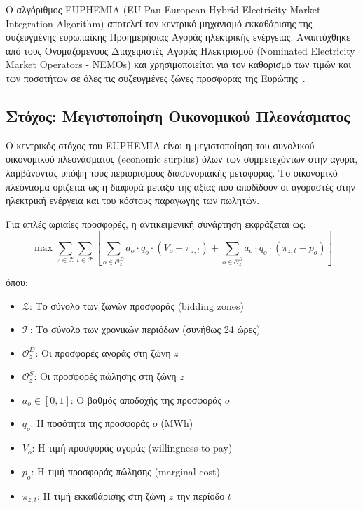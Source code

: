 Ο αλγόριθμος EUPHEMIA (EU Pan-European Hybrid Electricity Market Integration Algorithm) αποτελεί τον κεντρικό μηχανισμό εκκαθάρισης της συζευγμένης ευρωπαϊκής Προημερήσιας Αγοράς ηλεκτρικής ενέργειας. Αναπτύχθηκε από τους Ονομαζόμενους Διαχειριστές Αγοράς Ηλεκτρισμού (Nominated Electricity Market Operators - NEMOs) και χρησιμοποιείται για τον καθορισμό των τιμών και των ποσοτήτων σε όλες τις συζευγμένες ζώνες προσφοράς της Ευρώπης~\cite{euphemia-public-description}.

\subsection{Στόχος: Μεγιστοποίηση Οικονομικού Πλεονάσματος}
\label{subsec:euphemia-objective}

Ο κεντρικός στόχος του EUPHEMIA είναι η μεγιστοποίηση του συνολικού οικονομικού πλεονάσματος (economic surplus) όλων των συμμετεχόντων στην αγορά, λαμβάνοντας υπόψη τους περιορισμούς διασυνοριακής μεταφοράς. Το οικονομικό πλεόνασμα ορίζεται ως η διαφορά μεταξύ της αξίας που αποδίδουν οι αγοραστές στην ηλεκτρική ενέργεια και του κόστους παραγωγής των πωλητών.

Για απλές ωριαίες προσφορές, η αντικειμενική συνάρτηση εκφράζεται ως:
\begin{equation}
\label{eq:euphemia-objective}
\max \sum_{z \in \mathcal{Z}} \sum_{t \in \mathcal{T}} \left[ \sum_{o \in \mathcal{O}_z^D} a_o \cdot q_o \cdot (V_o - \pi_{z,t}) + \sum_{o \in \mathcal{O}_z^S} a_o \cdot q_o \cdot (\pi_{z,t} - p_o) \right]
\end{equation}

όπου:
\begin{itemize}
    \item $\mathcal{Z}$: Το σύνολο των ζωνών προσφοράς (bidding zones)
    \item $\mathcal{T}$: Το σύνολο των χρονικών περιόδων (συνήθως 24 ώρες)
    \item $\mathcal{O}_z^D$: Οι προσφορές αγοράς στη ζώνη $z$
    \item $\mathcal{O}_z^S$: Οι προσφορές πώλησης στη ζώνη $z$
    \item $a_o \in [0, 1]$: Ο βαθμός αποδοχής της προσφοράς $o$
    \item $q_o$: Η ποσότητα της προσφοράς $o$ (MWh)
    \item $V_o$: Η τιμή προσφοράς αγοράς (willingness to pay)
    \item $p_o$: Η τιμή προσφοράς πώλησης (marginal cost)
    \item $\pi_{z,t}$: Η τιμή εκκαθάρισης στη ζώνη $z$ την περίοδο $t$
\end{itemize}

